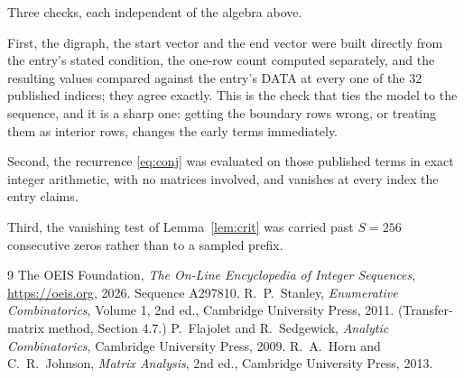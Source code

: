 \documentclass[11pt,a4paper]{article}
\theoremstyle{plain}
\theoremstyle{definition}
\begin{document}
Three checks, each independent of the algebra above.

First, the digraph, the start vector and the end vector were built directly from the
entry's stated condition, the one-row count computed separately, and the resulting values
compared against the entry's DATA at every one of the $32$ published indices; they
agree exactly. This is the check that ties the model to the sequence, and it is a sharp one:
getting the boundary rows wrong, or treating them as interior rows, changes the early terms
immediately.

Second, the recurrence \eqref{eq:conj} was evaluated on those published terms in exact
integer arithmetic, with no matrices involved, and vanishes at every index the entry claims.

Third, the vanishing test of Lemma~\ref{lem:crit} was carried past $S=256$ consecutive
zeros rather than to a sampled prefix.

\begin{thebibliography}{9}
 The OEIS Foundation, \emph{The On-Line Encyclopedia of Integer
Sequences}, \url{https://oeis.org}, 2026. Sequence A297810.
 R.~P.~Stanley, \emph{Enumerative Combinatorics}, Volume 1, 2nd ed.,
Cambridge University Press, 2011. (Transfer-matrix method, Section 4.7.)
 P.~Flajolet and R.~Sedgewick, \emph{Analytic Combinatorics}, Cambridge
University Press, 2009.
 R.~A.~Horn and C.~R.~Johnson, \emph{Matrix Analysis}, 2nd ed., Cambridge
University Press, 2013.
\end{thebibliography}
\end{document}
